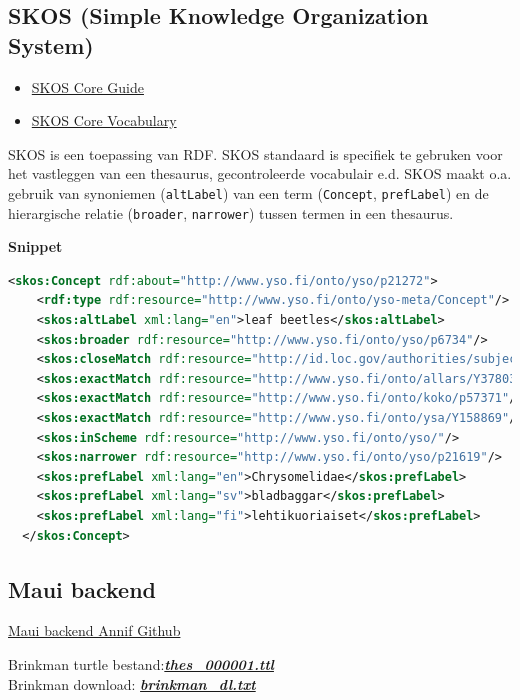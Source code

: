 \documentclass{article}
\begin{document}
\subsection{SKOS (Simple Knowledge Organization System)}

\begin{itemize}
  \item \href{https://www.w3.org/TR/2005/WD-swbp-skos-core-guide-20051102/}{SKOS Core Guide}
  \item \href{https://www.w3.org/TR/2005/WD-swbp-skos-core-spec-20051102/}{SKOS Core Vocabulary}
\end{itemize}

SKOS is een toepassing van RDF. SKOS standaard is specifiek te gebruken voor het vastleggen  van een thesaurus, gecontroleerde vocabulair e.d. SKOS maakt o.a. gebruik van synoniemen (\texttt{altLabel}) van een term (\texttt{Concept}, \texttt{prefLabel}) en de hierargische relatie (\texttt{broader}, \texttt{narrower}) tussen termen in een thesaurus. 


\noindent
\textbf{Snippet}

\begin{lstlisting}[language=xml]
  <skos:Concept rdf:about="http://www.yso.fi/onto/yso/p21272">
    <rdf:type rdf:resource="http://www.yso.fi/onto/yso-meta/Concept"/>
    <skos:altLabel xml:lang="en">leaf beetles</skos:altLabel>
    <skos:broader rdf:resource="http://www.yso.fi/onto/yso/p6734"/>
    <skos:closeMatch rdf:resource="http://id.loc.gov/authorities/subjects/sh85025443"/>
    <skos:exactMatch rdf:resource="http://www.yso.fi/onto/allars/Y37803"/>
    <skos:exactMatch rdf:resource="http://www.yso.fi/onto/koko/p57371"/>
    <skos:exactMatch rdf:resource="http://www.yso.fi/onto/ysa/Y158869"/>
    <skos:inScheme rdf:resource="http://www.yso.fi/onto/yso/"/>
    <skos:narrower rdf:resource="http://www.yso.fi/onto/yso/p21619"/>
    <skos:prefLabel xml:lang="en">Chrysomelidae</skos:prefLabel>
    <skos:prefLabel xml:lang="sv">bladbaggar</skos:prefLabel>
    <skos:prefLabel xml:lang="fi">lehtikuoriaiset</skos:prefLabel>
  </skos:Concept>
\end{lstlisting}

\subsection{Maui backend}

\href{https://github.com/NatLibFi/Annif/wiki/Backend%3A-Maui}{Maui backend Annif Github}

\begin{shaded}
\noindent
Brinkman turtle bestand:\quad \href{run:/Users/haighton_macbook/Desktop/Projects/KB/automatisch_onderwerp_ontsluiting/scripts/data/thes_000001.ttl}{\textbf{\textit{thes\_000001.ttl}}} \\
Brinkman download: \quad \quad
\href{/Users/haighton_macbook/Desktop/Projects/KB/brinkman_skos/data/brinkman_dl.txt}{\textbf{\textit{brinkman\_dl.txt}}}

\end{shaded}
\end{document}

